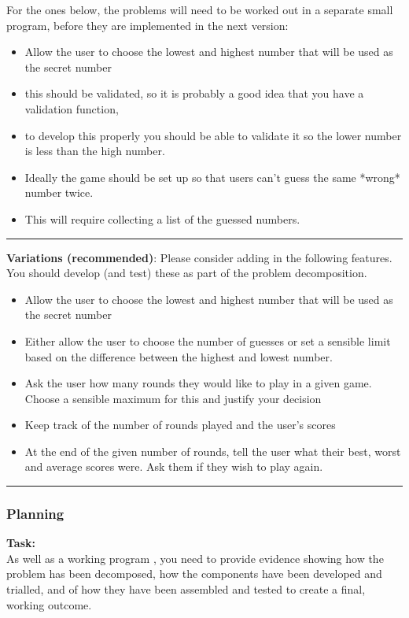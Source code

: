 \documentclass[a4paper,12pt]{article}
\begin{document}
For the ones below, the problems will need to be worked out in a separate small program, before they are implemented in the next version:
\begin{itemize}
	\item Allow the user to choose the lowest and highest number that will be used as the secret number
	\item 	this should be validated, so it is probably a good idea that you have a validation function,
	\item to develop this properly you should be able to validate it so the lower number is less than the high number.
	\item Ideally the game should be set up so that users can’t guess the same *wrong* number twice.
	\item This will require collecting a list of the guessed numbers.
\end{itemize}
\hrule\vspace{0.5cm}
\textbf{Variations (recommended)}:
Please consider adding in the following features.  You should develop (and test) these as part of the problem decomposition.
\begin{itemize}
	\item Allow the user to choose the lowest and highest number that will be used as the secret number
	\item Either allow the user to choose the number of guesses or set a sensible limit based on the difference between the highest and lowest number.
	\item Ask the user how many rounds they would like to play in a given game.  Choose a sensible maximum for this and justify your decision
	\item Keep track of the number of rounds played and the user’s scores
	\item At the end of the given number of rounds, tell the user what their best, worst and average scores were.  Ask them if they wish to play again.
\end{itemize}
\hrule\vspace{0.5cm}


\subsubsection{Planning}
\textbf{Task:}\\
As well as a working program , you need to provide evidence showing how the problem has been decomposed,  how the components have been developed and trialled, and of how they have been assembled and tested to create a final, working outcome.\\
\end{document}
